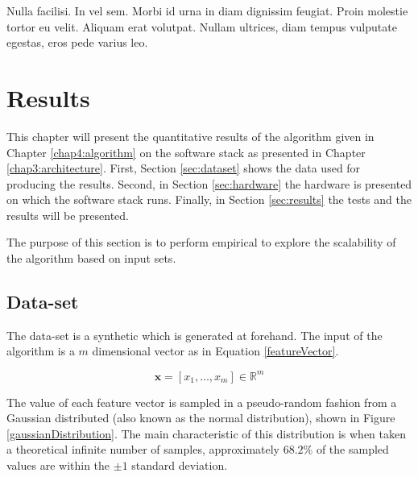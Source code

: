 \begin{savequote}[75mm] 
Nulla facilisi. In vel sem. Morbi id urna in diam dignissim feugiat. Proin molestie tortor eu velit. Aliquam erat volutpat. Nullam ultrices, diam tempus vulputate egestas, eros pede varius leo.
\end{savequote}

\chapter{Results \label{chap5:results}}

This chapter will present the quantitative results of the algorithm given in Chapter \ref{chap4:algorithm} on the software stack as presented in Chapter \ref{chap3:architecture}. First, Section \ref{sec:dataset} shows the data used for producing the results. Second, in Section \ref{sec:hardware} the hardware is presented on which the software stack runs. Finally, in Section \ref{sec:results} the tests and the results will be presented.

The purpose of this section is to perform empirical to explore the scalability of the algorithm based on input sets.

\section{Data-set \label{sec:dataset}}

The data-set is a synthetic which is generated at forehand. The input of the algorithm is a $m$ dimensional vector as in Equation \ref{featureVector}.

\begin{equation}
\textbf{x} = [x_{1},\ldots,x_{m}] \in \mathbb{R}^{m} \label{featureVector}
\end{equation}

The value of each feature vector is sampled in a pseudo-random fashion from a Gaussian distributed (also known as the normal distribution), shown in Figure \ref{gaussianDistribution}. The main characteristic of this distribution is when taken a theoretical infinite number of samples, approximately $68.2\%$ of the sampled values are within the $\pm 1$ standard deviation.

